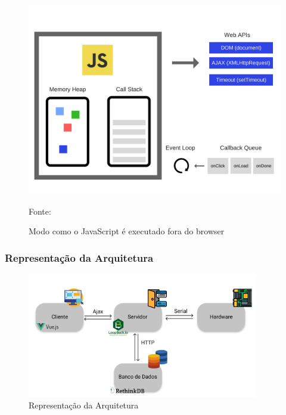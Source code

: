 \begin{figure}[h!]
	\centering
	\label{javascript backend}
		\includegraphics[keepaspectratio=true,scale=0.5]{figuras/javascript-backend.png}
	\caption{Modo como o JavaScript é executado fora do browser}
	{\footnotesize Fonte: \cite{javascript-backend}}
	\label{fig:javascript backend}
\end{figure}



\subsubsection{Representação da Arquitetura}

\begin{figure}[H]
\centering
\includegraphics[width=0.9\textwidth]{figuras/representacao_arq.png}
\caption{Representação da Arquitetura}
\label{fig:representacao_arq}
\end{figure}



